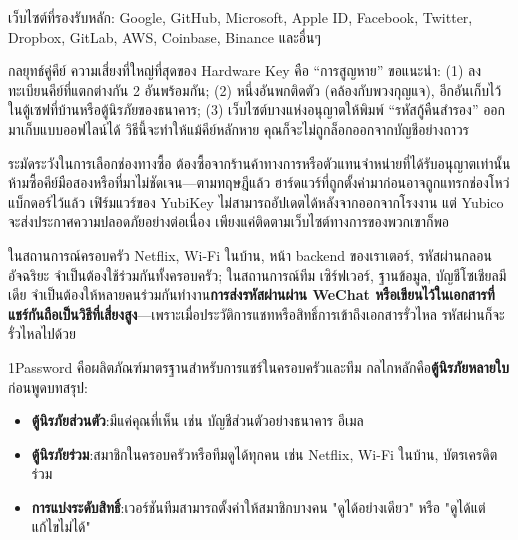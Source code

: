 เว็บไซต์ที่รองรับหลัก: Google, GitHub, Microsoft, Apple ID, Facebook, Twitter, Dropbox, GitLab, AWS, Coinbase, Binance และอื่นๆ

\begin{tcbinfo}{กลยุทธ์คู่คีย์}
ความเสี่ยงที่ใหญ่ที่สุดของ Hardware Key คือ “การสูญหาย” ขอแนะนำ: (1) ลงทะเบียนคีย์ที่แตกต่างกัน 2 อันพร้อมกัน; (2) หนึ่งอันพกติดตัว (คล้องกับพวงกุญแจ), อีกอันเก็บไว้ในตู้เซฟที่บ้านหรือตู้นิรภัยของธนาคาร; (3) เว็บไซต์บางแห่งอนุญาตให้พิมพ์ “รหัสกู้คืนสำรอง” ออกมาเก็บแบบออฟไลน์ได้ วิธีนี้จะทำให้แม้คีย์หลักหาย คุณก็จะไม่ถูกล็อกออกจากบัญชีอย่างถาวร

\end{tcbinfo}

\begin{tcbwarn}{ระมัดระวังในการเลือกช่องทางซื้อ}
ต้องซื้อจากร้านค้าทางการหรือตัวแทนจำหน่ายที่ได้รับอนุญาตเท่านั้น ห้ามซื้อคีย์มือสองหรือที่มาไม่ชัดเจน—ตามทฤษฎีแล้ว ฮาร์ดแวร์ที่ถูกตั้งค่ามาก่อนอาจถูกแทรกช่องโหว่แบ็กดอร์ไว้แล้ว เฟิร์มแวร์ของ YubiKey ไม่สามารถอัปเดตได้หลังจากออกจากโรงงาน แต่ Yubico จะส่งประกาศความปลอดภัยอย่างต่อเนื่อง เพียงแค่ติดตามเว็บไซต์ทางการของพวกเขาก็พอ

\end{tcbwarn}


ในสถานการณ์ครอบครัว Netflix, Wi-Fi ในบ้าน, หน้า backend ของเราเตอร์, รหัสผ่านกลอนอัจฉริยะ จำเป็นต้องใช้ร่วมกันทั้งครอบครัว; ในสถานการณ์ทีม เซิร์ฟเวอร์, ฐานข้อมูล, บัญชีโซเชียลมีเดีย จำเป็นต้องให้หลายคนร่วมกันทำงาน\textbf{การส่งรหัสผ่านผ่าน WeChat หรือเขียนไว้ในเอกสารที่แชร์กันถือเป็นวิธีที่เสี่ยงสูง}—เพราะเมื่อประวัติการแชทหรือสิทธิ์การเข้าถึงเอกสารรั่วไหล รหัสผ่านก็จะรั่วไหลไปด้วย


1Password คือผลิตภัณฑ์มาตรฐานสำหรับการแชร์ในครอบครัวและทีม กลไกหลักคือ\textbf{ตู้นิรภัยหลายใบ}ก่อนพูดบทสรุป:

\begin{itemize}
  \item \textbf{ตู้นิรภัยส่วนตัว}:มีแค่คุณที่เห็น เช่น บัญชีส่วนตัวอย่างธนาคาร อีเมล
  \item \textbf{ตู้นิรภัยร่วม}:สมาชิกในครอบครัวหรือทีมดูได้ทุกคน เช่น Netflix, Wi-Fi ในบ้าน, บัตรเครดิตร่วม
  \item \textbf{การแบ่งระดับสิทธิ์}:เวอร์ชันทีมสามารถตั้งค่าให้สมาชิกบางคน "ดูได้อย่างเดียว" หรือ "ดูได้แต่แก้ไขไม่ได้"
\end{itemize}

